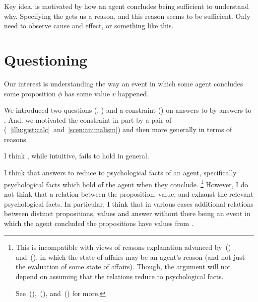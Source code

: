 \begin{note}
  Key idea.
  \issueInclusion{} is motivated by how an agent concludes being sufficient to understand why.
  Specifying the \pool{} gets us a reason, and this reason seems to be sufficient.
  Only need to observe cause and effect, or something like this.
\end{note}


\section*{Questioning \issueInclusion{}}

\begin{note}
  Our interest is understanding the way an event in which some agent \vAgent{} concludes some proposition \(\phi\) has some value \(v\) happened.

  We introduced two questions (\qWhy{}, \qHow{}) and a constraint (\issueInclusion{}) on answers to \qWhy{} by answers to \qHow{}.
  And, we motivated the constraint in part by a pair of  (~\ref{illu:gist:calc}~and~\ref{scen:animalism}) and then more generally in terms of reasons.

  I think \issueInclusion{}, while intuitive, fails to hold in general.
\end{note}

\begin{note}
  I think that answers to \qWhy{} reduce to psychological facts of an agent, specifically psychological facts which hold of the agent when they conclude.%
  \footnote{
    This is incompatible with views of reasons explanation advanced by~(\cite{Dancy:2000aa}) and~(\cite{Alvarez:2013aa}), in which the state of affairs may be an agent's reason (and not just the evaluation of some state of affairs).
    Though, the argument will not depend on assuming that the relations reduce to psychological facts.

    See~(\cite[413--418]{Hieronymi:2011aa}),~(\cite[3--5]{DOro:2013vh}), and~(\cite[\S2]{Alvarez:2017aa}) for more.
  }
  However, I do not think that a relation between the proposition, value, and \pool{} exhaust the relevant psychological facts.
  In particular, I think that in various cases additional relations between distinct propositions, values and  answer \qWhy{} without there being an event in which the agent concluded the propositions have values from .
\end{note}

